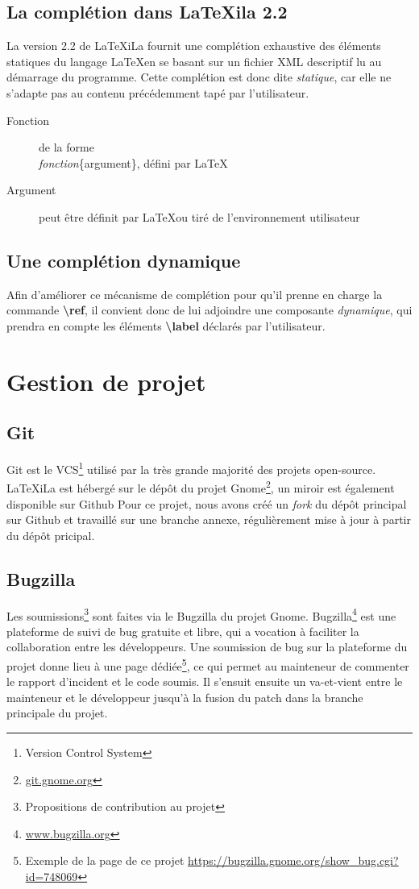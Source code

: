 \documentclass[a4paper,11pt]{report}
\begin{document}
\subsection{La complétion dans LaTeXila 2.2}
\label{sub:completion}
La version 2.2 de LaTeXiLa fournit une complétion exhaustive des éléments statiques du langage \LaTeX  en se basant sur un fichier XML descriptif lu au démarrage du programme.
Cette complétion est donc dite \textit{statique}, car elle ne s'adapte pas au contenu précédemment tapé par l'utilisateur. 

\begin{description}
  \item[Fonction] de la forme \\\textit{fonction}\{argument\}, défini par \LaTeX
  \item[Argument] peut être définit par \LaTeX  ou tiré de l'environnement utilisateur
\end{description}

\subsection{Une complétion dynamique}
\label{sub:completion_dyn}
Afin d'améliorer ce mécanisme de complétion pour qu'il prenne en charge la commande \textbf{\textbackslash{}ref}, il convient donc de lui adjoindre une composante \textit{dynamique}, qui prendra en compte les éléments \textbf{\textbackslash{}label} déclarés par l'utilisateur.

\section{Gestion de projet} %

\subsection{Git}
\label{sub:git}
Git est le VCS\footnote{Version Control System} utilisé par la très grande majorité des projets open-source. LaTeXiLa est hébergé sur le dépôt du projet Gnome\footnote{\url{git.gnome.org}}, un miroir est également disponible sur Github %
Pour ce projet, nous avons créé un \textit{fork} du dépôt principal sur Github et travaillé sur une branche annexe, régulièrement mise à jour à partir du dépôt pricipal.

\subsection{Bugzilla}
Les soumissions\footnote{Propositions de contribution au projet} sont faites via le Bugzilla du projet Gnome.
Bugzilla\footnote{\url{www.bugzilla.org}} est une plateforme de suivi de bug gratuite et libre, qui a vocation à faciliter la collaboration entre les développeurs.
Une soumission de bug sur la plateforme du projet donne lieu à une page dédiée\footnote{Exemple de la page de ce projet \url{https://bugzilla.gnome.org/show_bug.cgi?id=748069}}, ce qui permet au mainteneur de commenter le rapport d'incident et le code soumis.
Il s'ensuit ensuite un va-et-vient entre le mainteneur et le développeur jusqu'à la fusion du patch dans la branche principale du projet.
\end{document}
